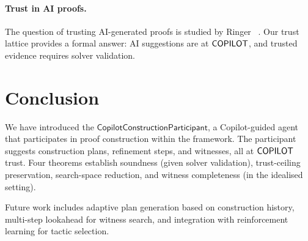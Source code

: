 \documentclass[11pt]{article}
\newcommand{\CCP}{\mathsf{CopilotConstructionParticipant}}
\begin{document}
\paragraph{Trust in AI proofs.}
The question of trusting AI-generated proofs is studied
by Ringer \etal{}~\cite{first2022diversity}.  Our trust lattice
provides a formal answer: AI suggestions are at $\mathsf{COPILOT}$,
and trusted evidence requires solver validation.

\section{Conclusion}\label{sec:conclusion}

We have introduced the $\CCP$, a Copilot-guided agent that
participates in proof construction within the \JuGeo{}
framework.  The participant suggests construction plans,
refinement steps, and witnesses, all at $\mathsf{COPILOT}$ trust.
Four theorems establish soundness (given solver validation),
trust-ceiling preservation, search-space reduction, and
witness completeness (in the idealised setting).

Future work includes adaptive plan generation based on
construction history, multi-step lookahead for witness
search, and integration with reinforcement learning for
tactic selection.
\end{document}

